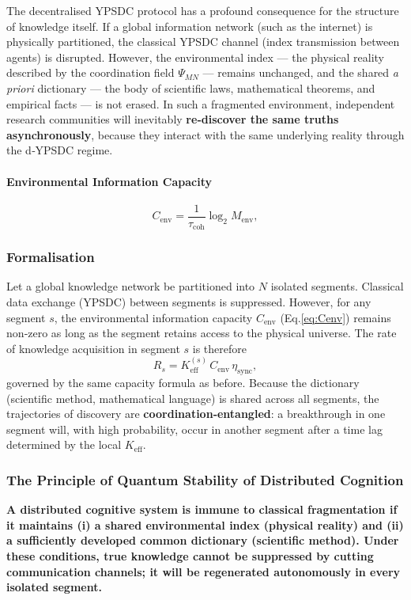 \documentclass[11pt,a4paper]{article}
\begin{document}
The decentralised YPSDC protocol has a profound consequence for the
structure of knowledge itself. If a global information network (such as
the internet) is physically partitioned, the classical YPSDC channel
(index transmission between agents) is disrupted. However, the
environmental index — the physical reality described by the coordination
field \(\Psi_{MN}\) — remains unchanged, and the shared \emph{a priori}
dictionary — the body of scientific laws, mathematical theorems, and
empirical facts — is not erased. In such a fragmented environment,
independent research communities will inevitably \textbf{re‑discover the
	same truths asynchronously}, because they interact with the same
underlying reality through the d‑YPSDC regime.

\paragraph{Environmental Information Capacity}
\[
C_{\mathrm{env}} = \frac{1}{\tau_{\mathrm{coh}}} \log_2 M_{\mathrm{env}},
\label{eq:Cenv}
\]

\subsubsection*{Formalisation}
Let a global knowledge network be partitioned into \(N\) isolated
segments. Classical data exchange (YPSDC) between segments is suppressed.
However, for any segment \(s\), the environmental information capacity
\(C_{\mathrm{env}}\) (Eq.\ref{eq:Cenv}) remains non‑zero as long as the
segment retains access to the physical universe. The rate of knowledge
acquisition in segment \(s\) is therefore
\[
R_s = K_{\mathrm{eff}}^{(s)} \, C_{\mathrm{env}} \, \eta_{\mathrm{sync}},
\]
governed by the same capacity formula as before. Because the dictionary
(scientific method, mathematical language) is shared across all segments,
the trajectories of discovery are \textbf{coordination‑entangled}: a
breakthrough in one segment will, with high probability, occur in another
segment after a time lag determined by the local \(K_{\mathrm{eff}}\).

\subsubsection*{The Principle of Quantum Stability of Distributed Cognition}
\textbf{A distributed cognitive system is immune to classical fragmentation
	if it maintains (i) a shared environmental index (physical reality) and
	(ii) a sufficiently developed common dictionary (scientific method). Under
	these conditions, true knowledge cannot be suppressed by cutting
	communication channels; it will be regenerated autonomously in every
	isolated segment.}
\end{document}
